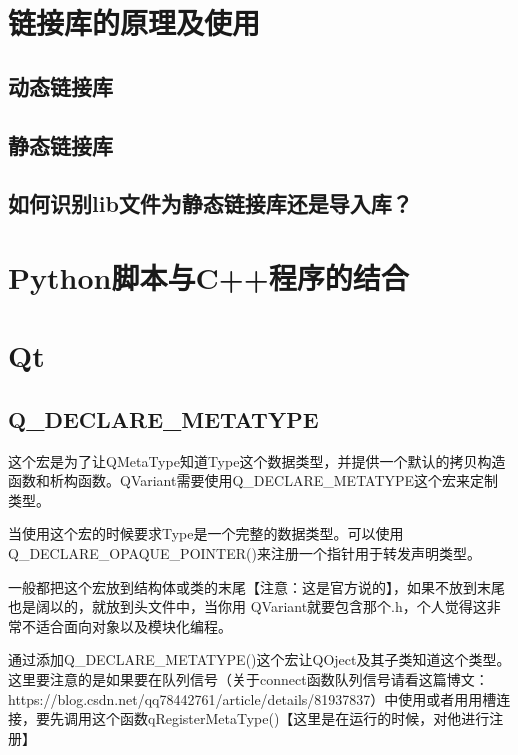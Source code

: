 \section{链接库的原理及使用}
\subsection{动态链接库}
\subsection{静态链接库}
\subsection{如何识别lib文件为静态链接库还是导入库？}
\section{Python脚本与C++程序的结合}

\section{Qt}
\subsection{Q\_DECLARE\_METATYPE}
这个宏是为了让QMetaType知道Type这个数据类型，并提供一个默认的拷贝构造函数和析构函数。QVariant需要使用Q\_DECLARE\_METATYPE这个宏来定制类型。

当使用这个宏的时候要求Type是一个完整的数据类型。可以使用Q\_DECLARE\_OPAQUE\_POINTER()来注册一个指针用于转发声明类型。

一般都把这个宏放到结构体或类的末尾【注意：这是官方说的】，如果不放到末尾也是阔以的，就放到头文件中，当你用 QVariant就要包含那个.h，个人觉得这非常不适合面向对象以及模块化编程。

通过添加Q\_DECLARE\_METATYPE()这个宏让QOject及其子类知道这个类型。这里要注意的是如果要在队列信号（关于connect函数队列信号请看这篇博文：https://blog.csdn.net/qq78442761/article/details/81937837）中使用或者用用槽连接，要先调用这个函数qRegisterMetaType()【这里是在运行的时候，对他进行注册】